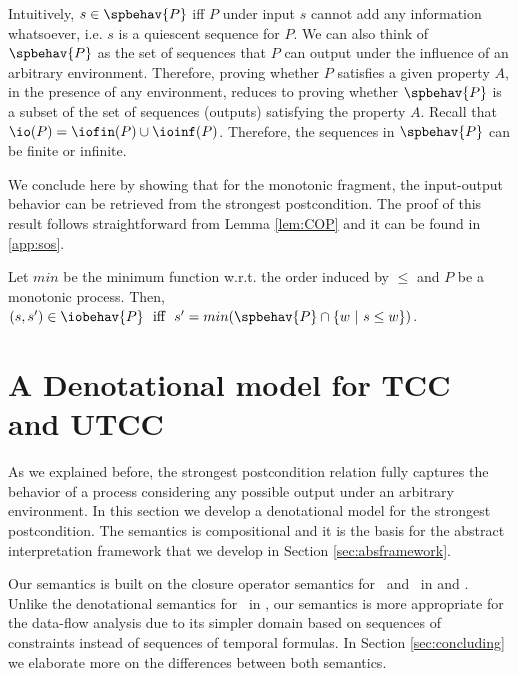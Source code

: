\documentclass{tlp}
\begin{document}
Intuitively,   $s \in \spbehav{P}$ iff $P$ under input $s$ cannot 
add any information whatsoever, i.e.  $s$  is a quiescent sequence for $P$.  We can also think of   $\spbehav{P}$ as the set of sequences that $P$ can output under the influence of an arbitrary environment. 
Therefore, proving whether $P$ satisfies a given  property $A$,  in the presence of any environment, reduces to proving whether  $\spbehav{P}$ is a subset of the set of sequences (outputs) satisfying the property $A$. Recall that $\io(P) = \iofin(P) \cup \ioinf(P)$. Therefore, the sequences in $\spbehav{P}$ can be finite or infinite. 

We conclude here by showing that for the    monotonic fragment,   the input-output behavior can be retrieved 
from  the strongest postcondition. The proof of this result follows  straightforward from Lemma \ref{lem:COP} 
and it can be found in \ref{app:sos}. 


\begin{theorem}\label{the:col:CO}
Let $min$ be the minimum function w.r.t. the order induced by $\leq$ and  $P$ be a monotonic process. Then, 
$(s, s') \in \iobehav{P} \mbox{\ \ iff\ \  } 
s' = min(\spbehav{P} \cap \{w \ | \ s \leq w \})
$.
\end{theorem}






\section{A Denotational model for TCC and UTCC}\label{sec:denotsem}


As we explained before,  the strongest postcondition relation fully captures the behavior of a process  considering any possible output under an arbitrary environment. In this section we develop a denotational model for the strongest postcondition. The semantics is compositional and it is the basis for the 
abstract interpretation framework that we 
develop in Section \ref{sec:absframework}. 


Our semantics is built on the closure operator semantics for \ccp\ and \tccp\ in \cite{SRP91,tcc-lics94} and \cite{deBoer:97:TOPLAS,NPV02}.
Unlike the denotational semantics for \utcc\ in \cite{Olarte:08:PPDP}, our semantics is more appropriate for the data-flow analysis due to its simpler domain based on sequences of constraints instead of sequences of temporal formulas. In  Section \ref{sec:concluding} we elaborate  more on the differences between both semantics. 
\end{document}
